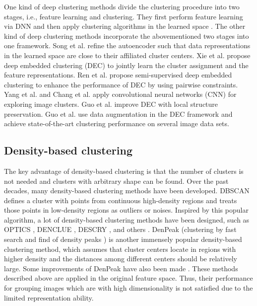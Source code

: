 \documentclass[10pt,twocolumn,letterpaper]{article}
\begin{document}
One kind of deep clustering methods divide the clustering procedure into two stages, i.e., feature learning and clustering. They first perform feature learning via DNN and then apply clustering algorithms in the learned space \cite{Chen2015DeepLW,Peng2016Deep,Shao2015DeepLC,tian2014learning}.
The other kind of deep clustering methods incorporate the abovementioned two stages into one framework. Song et al. \cite{song2013auto} refine the autoencoder such that data representations in the learned space are close to their affiliated cluster centers. 
Xie et al. \cite{Xie2016UnsupervisedDE} propose deep embedded clustering (DEC) to jointly learn the cluster assignment and the feature representations. 
Ren et al. \cite{Ren2019SDEC} propose semi-supervised deep embedded clustering to enhance the performance of DEC by using pairwise constraints. 
Yang et al. \cite{yang2016joint} and Chang et al. \cite{chang2017deep} apply convolutional neural networks (CNN) for exploring image clusters.
Guo et al. \cite{guo2017improved} improve DEC with local structure preservation.
Guo et al. \cite{Guo2018DEC-DA} use data augmentation in the DEC framework and achieve state-of-the-art clustering performance on several image data sets.

\subsection{Density-based clustering}
The key advantage of density-based clustering is that the number of clusters is not needed and clusters with arbitrary shape can be found.
Over the past decades, many density-based clustering methods have been developed.
DBSCAN \cite{ester1996density} defines a cluster with points from continuous high-density regions and treats those points in low-density regions as outliers or noises. Inspired by this popular algorithm, a lot of density-based clustering methods have been designed, such as OPTICS \cite{ankerst1999optics}, DENCLUE \cite{hinneburg1998efficient}, DESCRY \cite{angiulli2004descry}, and others \cite{du2016density,gu2017parallel,lv2016efficient,mai2015anytime}.
DenPeak (clustering by fast search and find of density peaks
) \cite{rodriguez2014clustering} is another immensely popular density-based clustering method, which assumes that cluster centers locate in regions with higher density and the distances among different centers should be relatively large. Some improvements of DenPeak have also been made \cite{Liu2017adaptive,mehmood2017clustering,XU2016DenPEHC}.
These methods described above are applied in the original feature space. Thus, their performance for grouping images which are with high dimensionality is not satisfied due to the limited representation ability.
\end{document}
